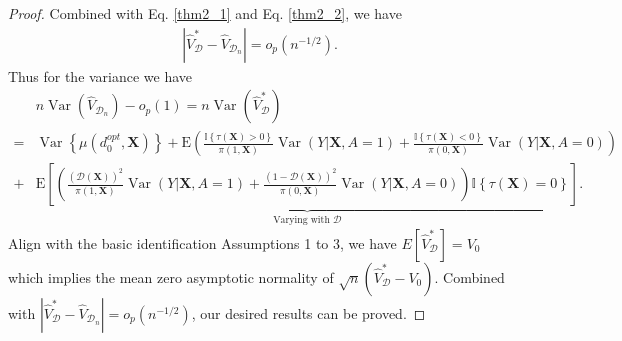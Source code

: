 \documentclass[11pt]{article}
\theoremstyle{referenceplain}
\theoremstyle{referencedefinition}
\theoremstyle{referenceremark}
\begin{document}
\begin{proof}
    Combined with Eq. \eqref{thm2_1} and Eq. \eqref{thm2_2}, we have
    \begin{align*}
        |\widehat{V}_{\mathcal{D}}^*-\widehat{V}_{\mathcal{D}_n}|=o_p(n^{-1/2}).
    \end{align*}
    Thus for the variance we have
    \begin{align*}
        &n\operatorname{Var}\left(\widehat{V}_{\mathcal{D}_n}\right)-o_p(1)=n\operatorname{Var}\left(\widehat{V}_{\mathcal{D}}^*\right)\\
          =& \operatorname{Var}\left\{\mu\left(d_0^{o p t}, \mathbf{X}\right)\right\}+ \mathrm{E}\left(\frac{\mathbb{I}\left\{\tau\left(\mathbf{X}\right)>0\right\}}{\pi\left(1, \mathbf{X}\right)}\operatorname{Var}(Y|\mathbf{X},A=1)+\frac{\mathbb{I}\left\{\tau\left(\mathbf{X}\right)<0\right\}}{\pi\left(0, \mathbf{X}\right)}\operatorname{Var}(Y|\mathbf{X},A=0)\right)\\
    +&\underbrace{\mathrm{E}\left[\left(\frac{(\mathcal{D}(\mathbf{X}))^2}{\pi\left(1, \mathbf{X}\right)}\operatorname{Var}(Y|\mathbf{X},A=1)+\frac{(1-\mathcal{D}(\mathbf{X}))^2}{\pi\left(0, \mathbf{X}\right)}\operatorname{Var}(Y|\mathbf{X},A=0)\right) \mathbb{I}\left\{\tau\left(\mathbf{X}\right)=0\right\}\right]}_{\text{Varying with $\mathcal{D}$}}.
    \end{align*}
    Align with the basic identification Assumptions 1 to 3, we have $E[\widehat{V}_{\mathcal{D}}^*] = V_0$ which implies the mean zero asymptotic normality of $\sqrt{n}(\widehat{V}_{\mathcal{D}}^* - V_0)$. Combined with $ |\widehat{V}_{\mathcal{D}}^*-\widehat{V}_{\mathcal{D}_n}|=o_p(n^{-1/2})$, our desired results can be proved.
\end{proof}
\end{document}
